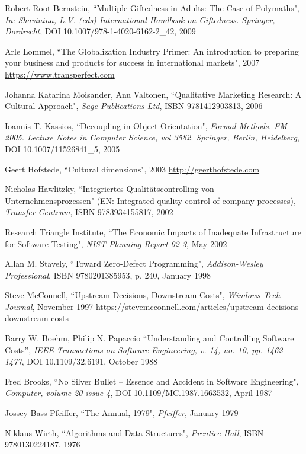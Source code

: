 \begin{thebibliography}{100}
 Robert Root-Bernstein, ``Multiple Giftedness in Adults: The Case of Polymaths", 
\emph{In: Shavinina, L.V. (eds) International Handbook on Giftedness. Springer, Dordrecht}, 
DOI 10.1007/978-1-4020-6162-2\_42, 2009

 Arle Lommel, ``The Globalization Industry Primer: An introduction to preparing your
business and products for success in international markets", 2007
\href{https://marketing.transperfect.com/acton/attachment/687/f-0f09/1/-/-/-/-/lisa_globalization_primer.pdf}{https://www.transperfect.com}

 Johanna Katarina Moisander, Anu Valtonen, ``Qualitative Marketing Research: A 
Cultural Approach", \emph{Sage Publications Ltd}, ISBN 9781412903813, 2006

 Ioannis T. Kassios, ``Decoupling in Object Orientation", \emph{Formal Methods. FM 2005. 
Lecture Notes in Computer Science, vol 3582. Springer, Berlin, Heidelberg}, DOI 10.1007/11526841\_5, 2005

 Geert Hofstede, ``Cultural dimensions", 2003 \href{http://geerthofstede.com}{http://geerthofstede.com}

 Nicholas Hawlitzky, ``Integriertes Qualitätscontrolling von Unternehmensprozessen" (EN: 
Integrated quality control of company processes), \emph{Transfer-Centrum}, ISBN 9783934155817, 2002

 Research Triangle Institute, ``The Economic Impacts of Inadequate Infrastructure for 
Software Testing", \emph{NIST Planning Report 02-3}, May 2002

 Allan M. Stavely, ``Toward Zero-Defect Programming", \emph{Addison-Wesley Professional}, 
ISBN 9780201385953, p. 240, January 1998

 Steve McConnell, ``Upstream Decisions, Downstream Costs", \emph{Windows Tech Journal}, November 1997
\href{https://stevemcconnell.com/articles/upstream-decisions-downstream-costs}{https://stevemcconnell.com/articles/upstream-decisions-downstream-costs}

 Barry W. Boehm, Philip N. Papaccio ``Understanding and Controlling Software Costs”,
\emph{IEEE Transactions on Software Engineering, v. 14, no. 10, pp. 1462-1477}, DOI 10.1109/32.6191, October 1988

 Fred Brooks, ``No Silver Bullet -- Essence and Accident in Software Engineering", 
\emph{Computer, volume 20 issue 4}, DOI 10.1109/MC.1987.1663532, April 1987

 Jossey-Bass Pfeiffer, ``The Annual, 1979", \emph{Pfeiffer}, January 1979

 Niklaus Wirth, ``Algorithms and Data Structures", 
\emph{Prentice-Hall}, ISBN 9780130224187, 1976

\end{thebibliography}
